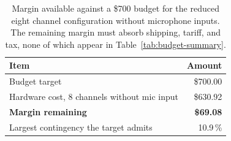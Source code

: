 \documentclass[11pt, letterpaper,titlepage]{article}
\begin{document}
\begin{table}[H]
\centering
\caption{Margin available against a \$700 budget for the reduced eight channel
configuration without microphone inputs. The remaining margin must absorb
shipping, tariff, and tax, none of which appear in Table~\ref{tab:budget-summary}.}
\label{tab:budget-margin}
\begin{tabular}{l r}
\toprule
\textbf{Item} & \textbf{Amount} \\
\midrule
Budget target                                   & \$700.00 \\
Hardware cost, 8 channels without mic input     & \$630.92 \\
\midrule
\textbf{Margin remaining}                       & \textbf{\$69.08} \\
Largest contingency the target admits           & 10.9\,\% \\
\bottomrule
\end{tabular}
\end{table}
\end{document}
